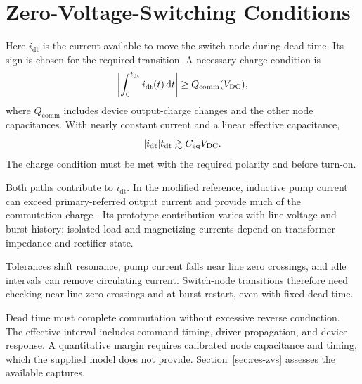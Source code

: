 \section{Zero-Voltage-Switching Conditions}
\label{sec:analysis-zvs}

Here \(i_{\mathrm{dt}}\) is the current available to move the switch node during dead time. Its sign is chosen for the required transition. A necessary charge condition is
\begin{equation}
\left|\int_0^{t_{\mathrm{dt}}}i_{\mathrm{dt}}(t)\,\mathrm{d}t\right|
\geq Q_{\mathrm{comm}}(V_{\mathrm{DC}}),
\label{eq:analysis-zvs-charge}
\end{equation}
where \(Q_{\mathrm{comm}}\) includes device output-charge changes and the other node capacitances. With nearly constant current and a linear effective capacitance,
\begin{equation}
|i_{\mathrm{dt}}|t_{\mathrm{dt}}\gtrsim C_{\mathrm{eq}}V_{\mathrm{DC}}.
\end{equation}
The charge condition must be met with the required polarity and before turn-on.

Both paths contribute to \(i_{\mathrm{dt}}\). In the modified reference, inductive pump current can exceed primary-referred output current and provide much of the commutation charge \cite{ammar2021led}. Its prototype contribution varies with line voltage and burst history; isolated load and magnetizing currents depend on transformer impedance and rectifier state.

Tolerances shift resonance, pump current falls near line zero crossings, and idle intervals can remove circulating current. Switch-node transitions therefore need checking near line zero crossings and at burst restart, even with fixed dead time.

Dead time must complete commutation without excessive reverse conduction. The effective interval includes command timing, driver propagation, and device response. A quantitative margin requires calibrated node capacitance and timing, which the supplied model does not provide. Section~\ref{sec:res-zvs} assesses the available captures.
